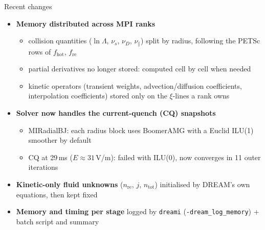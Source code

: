 
\begin{frame}{Recent changes}
    \begin{itemize}
        \item \textbf{Memory distributed across MPI ranks}
        \begin{itemize}
            \item collision quantities ($\ln\Lambda$, $\nu_s$, $\nu_D$, $\nu_\parallel$) split by radius,
                  following the PETSc rows of $f_\mathrm{hot}$, $f_\mathrm{re}$
            \item partial derivatives no longer stored: computed cell by cell when needed
            \item kinetic operators (transient weights, advection/diffusion coefficients,
                  interpolation coefficients) stored only on the $\xi$-lines a rank owns
        \end{itemize}
        \item \textbf{Solver now handles the current-quench (CQ) snapshots}
        \begin{itemize}
            \item MIRadialBJ: each radius block uses BoomerAMG with a
                  Euclid ILU(1) smoother by default
            \item CQ at 29\,ms ($E \approx 31$\,V/m): failed with ILU(0),
                  now converges in 11 outer iterations
        \end{itemize}
        \item \textbf{Kinetic-only fluid unknowns} ($n_\mathrm{re}$, $j$, $n_\mathrm{tot}$)
              initialised by DREAM's own equations, then kept fixed
        \item \textbf{Memory and timing per stage} logged by \texttt{dreami}
              (\texttt{-dream\_log\_memory}) + batch script and summary
    \end{itemize}
\end{frame}

